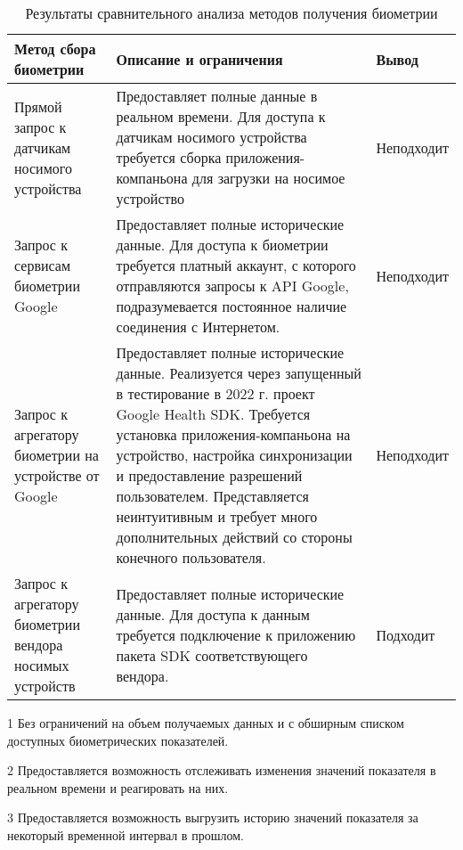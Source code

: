 \begin{table}[H]
	\centering
	\caption{\label{tab:biometrics_comparison}Результаты сравнительного анализа методов получения биометрии}
	\small
	\begin{threeparttable}
		\begin{tabularx}{\textwidth}{sXt}
			\toprule
			Метод сбора \newline биометрии
			& Описание и ограничения
			& Вывод \\
			\midrule\midrule
			Прямой запрос к датчикам носимого устройства
			& Предоставляет полные данные в реальном времени. \newline Для доступа к датчикам носимого устройства требуется сборка приложения-компаньона для загрузки на носимое устройство
			& Не\newline подходит \\\midrule
			Запрос к сервисам биометрии Google
			& Предоставляет полные исторические данные. \newline Для доступа к биометрии требуется платный аккаунт, с которого отправляются запросы к API Google, подразумевается постоянное наличие соединения с Интернетом.
			& Не\newline подходит \\\midrule
			Запрос к агрегатору биометрии на устройстве от Google
			& Предоставляет полные исторические данные. \newline Реализуется через запущенный в тестирование в 2022 г. проект Google Health SDK. Требуется установка приложения-компаньона на устройство, настройка синхронизации и предоставление разрешений пользователем. Представляется неинтуитивным и требует много дополнительных действий со стороны конечного пользователя.
			& Не\newline подходит \\\midrule
			Запрос к агрегатору биометрии вендора носимых устройств
			& Предоставляет полные исторические данные. \newline Для доступа к данным требуется подключение к приложению пакета SDK соответствующего вендора.
			& Подходит \\
			\bottomrule
		\end{tabularx}
		\smallskip
		\footnotesize
		\begin{tablenotes}
			\item[1] Без ограничений на объем получаемых данных и с обширным списком доступных биометрических показателей.
			\item[2] Предоставляется возможность отслеживать изменения значений показателя в реальном времени и реагировать на них.
			\item[3] Предоставляется возможность выгрузить историю значений показателя за некоторый временной интервал в прошлом.
		\end{tablenotes}
	\end{threeparttable}
\end{table}
\smallskip

